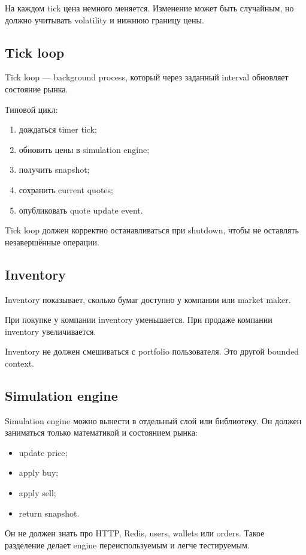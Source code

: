 \documentclass[12pt,a4paper]{article}
\begin{document}
На каждом tick цена немного меняется. Изменение может быть случайным, но должно
учитывать volatility и нижнюю границу цены.

\subsection{Tick loop}

Tick loop --- background process, который через заданный interval обновляет
состояние рынка.

Типовой цикл:
\begin{enumerate}
    \item дождаться timer tick;
    \item обновить цены в simulation engine;
    \item получить snapshot;
    \item сохранить current quotes;
    \item опубликовать quote update event.
\end{enumerate}

Tick loop должен корректно останавливаться при shutdown, чтобы не оставлять
незавершённые операции.

\subsection{Inventory}

Inventory показывает, сколько бумаг доступно у компании или market maker.

При покупке у компании inventory уменьшается. При продаже компании inventory
увеличивается.

Inventory не должен смешиваться с portfolio пользователя. Это другой bounded
context.

\subsection{Simulation engine}

Simulation engine можно вынести в отдельный слой или библиотеку. Он должен
заниматься только математикой и состоянием рынка:
\begin{itemize}
    \item update price;
    \item apply buy;
    \item apply sell;
    \item return snapshot.
\end{itemize}

Он не должен знать про HTTP, Redis, users, wallets или orders. Такое разделение
делает engine переиспользуемым и легче тестируемым.
\end{document}
